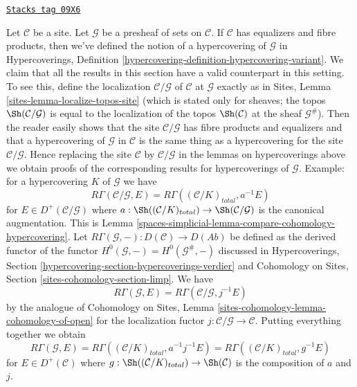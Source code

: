 \begin{remark}
\label{spaces-simplicial-remark-compare-cohomology-hypercovering-presheaf}
\href{https://stacks.math.columbia.edu/tag/09X6}{\texttt{Stacks tag 09X6}}

Let $\mathcal{C}$ be a site. Let $\mathcal{G}$ be a presheaf of sets on
$\mathcal{C}$. If $\mathcal{C}$ has equalizers and fibre products, then
we've defined the notion of a hypercovering of $\mathcal{G}$ in
Hypercoverings, Definition \ref{hypercovering-definition-hypercovering-variant}.
We claim that all the results in this section have a
valid counterpart in this setting.
To see this,
define the localization $\mathcal{C}/\mathcal{G}$
of $\mathcal{C}$ at $\mathcal{G}$ exactly as in
Sites, Lemma \ref{sites-lemma-localize-topos-site}
(which is stated only for sheaves; the topos
$\Sh(\mathcal{C}/\mathcal{G})$ is equal to the localization
of the topos $\Sh(\mathcal{C})$ at the sheaf $\mathcal{G}^\#$).
Then the reader easily shows that the site
$\mathcal{C}/\mathcal{G}$ has fibre products and equalizers
and that a hypercovering of $\mathcal{G}$ in $\mathcal{C}$
is the same thing as a hypercovering for the site $\mathcal{C}/\mathcal{G}$.
Hence replacing the site $\mathcal{C}$ by $\mathcal{C}/\mathcal{G}$
in the lemmas on hypercoverings above we obtain proofs of the
corresponding results for hypercoverings of $\mathcal{G}$.
Example: for a hypercovering $K$ of $\mathcal{G}$ we have
$$
R\Gamma(\mathcal{C}/\mathcal{G}, E) =
R\Gamma((\mathcal{C}/K)_{total}, a^{-1}E)
$$
for $E \in D^+(\mathcal{C}/\mathcal{G})$ where
$a : \Sh((\mathcal{C}/K)_{total}) \to \Sh(\mathcal{C}/\mathcal{G})$
is the canonical augmentation. This is
Lemma \ref{spaces-simplicial-lemma-compare-cohomology-hypercovering}.
Let $R\Gamma(\mathcal{G}, -) : D(\mathcal{C}) \to D(\textit{Ab})$
be defined as the derived functor of the functor
$H^0(\mathcal{G}, -) = H^0(\mathcal{G}^\#, -)$
discussed in Hypercoverings, Section
\ref{hypercovering-section-hypercoverings-verdier} and
Cohomology on Sites, Section \ref{sites-cohomology-section-limp}.
We have
$$
R\Gamma(\mathcal{G}, E) = R\Gamma(\mathcal{C}/\mathcal{G}, j^{-1}E)
$$
by the analogue of Cohomology on Sites, Lemma
\ref{sites-cohomology-lemma-cohomology-of-open}
for the localization fuctor $j : \mathcal{C}/\mathcal{G} \to \mathcal{C}$.
Putting everything together we obtain
$$
R\Gamma(\mathcal{G}, E) =
R\Gamma((\mathcal{C}/K)_{total}, a^{-1}j^{-1}E) =
R\Gamma((\mathcal{C}/K)_{total}, g^{-1}E)
$$
for $E \in D^+(\mathcal{C})$ where
$g : \Sh((\mathcal{C}/K)_{total}) \to \Sh(\mathcal{C})$
is the composition of $a$ and $j$.
\end{remark}


